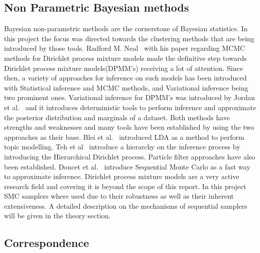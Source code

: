 \documentclass[twoside,hidelinks]{article}
\begin{document}
\subsection{Non Parametric Bayesian methods}

Bayesian non-parametric methods are the cornerstone of Bayesian statistics. In this project the focus was directed towards the clustering methods that are being introduced by those tools. Radford M. Neal~\cite{bayes:neal} with his paper regarding MCMC methods for Dirichlet process mixture models made the definitive step towards Dirichlet process mixture models(DPMM's) receiving a lot of attention. Since then, a variety of approaches for inference on such models has been introduced with Statistical inference and MCMC methods, and Variational inference being two prominent ones. Variational inference for DPMM's was introduced by Jordan et al.~\cite{bayes:jordan} and it introduces deterministic tools to perform inference and approximate the posterior distribution and marginals of a dataset. Both methods have strengths and weaknesses and many tools have been established by using the two approaches as their base. Blei et al.~\cite{LDA} introduced LDA as a method to perform topic modelling. Teh et al~\cite{bayes:hier} introduce a hierarchy on the inference process by introducing the Hierarchical Dirichlet process. Particle filter approaches have also been established. Doucet et al.~\cite{bayes:smc} introduce Sequential Monte Carlo as a fast way to approximate inference. Dirichlet process mixture models are a very active research field and covering it is beyond the scope of this report. In this project SMC samplers where used due to their robustness as well as their inherent extensiveness. A detailed description on the mechanisms of sequential samplers will be given in the theory section.

\subsection{Correspondence}
\end{document}
